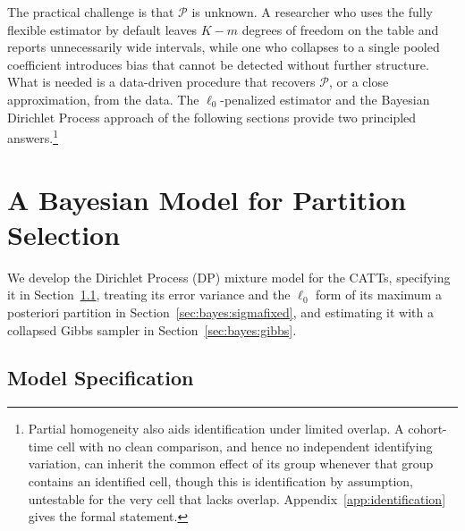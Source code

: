 \documentclass[margin=5in, 12pt]{article}
\newcommand{\1}{\mathbbm{1}}
\begin{document}
The practical challenge is that $\mathcal{P}$ is unknown. A researcher who uses
the fully flexible estimator by default leaves $K - m$ degrees of freedom on the
table and reports unnecessarily wide intervals, while one who collapses to a
single pooled coefficient introduces bias that cannot be detected without further
structure. What is needed is a data-driven procedure that recovers $\mathcal{P}$,
or a close approximation, from the data. The $\ell_0$-penalized estimator and the
Bayesian Dirichlet Process approach of the following sections provide two
principled answers.\footnote{Partial homogeneity also aids identification under limited overlap. A cohort-time cell with no clean comparison, and hence no independent identifying variation, can inherit the common effect of its group whenever that group contains an identified cell, though this is identification by assumption, untestable for the very cell that lacks overlap. Appendix~\ref{app:identification} gives the formal statement.}

  \section{A Bayesian Model for Partition Selection}\label{sec:bayes}
  We develop the Dirichlet Process (DP) mixture model for the CATTs, specifying it in Section~\ref{sec:bayes:model}, treating its error variance and the $\ell_0$ form of its maximum a posteriori partition in Section~\ref{sec:bayes:sigmafixed}, and estimating it with a collapsed Gibbs sampler in Section~\ref{sec:bayes:gibbs}.

  \subsection{Model Specification}\label{sec:bayes:model}
\end{document}
